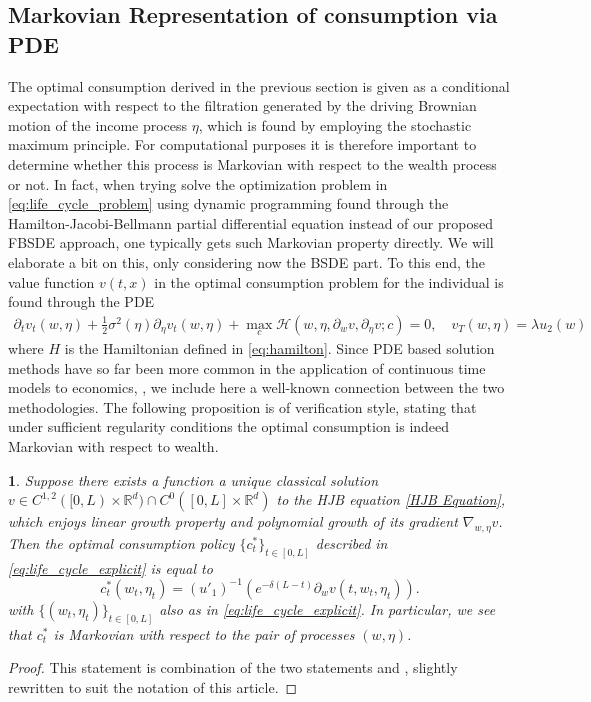 \documentclass[11pt,oneside,english,reqno,dvipsnames,table]{amsart}
\numberwithin{equation}{section}
\theoremstyle{plain}
\theoremstyle{definition}
\theoremstyle{remark}
\theoremstyle{plain}
\theoremstyle{plain}
\newtheorem{prop}[thm]{\protect\propositionname}
\theoremstyle{plain}
\theoremstyle{plain}
\theoremstyle{plain}
\theoremstyle{plain}
\theoremstyle{plain}
\providecommand{\propositionname}{Proposition}
\newcommand{\cH}{\mathcal{H}}
\newcommand{\RR}{\mathbb{R}}
\numberwithin{thm}{section}
\begin{document}
\subsection{Markovian Representation of consumption via PDE}
The optimal consumption derived in the previous section is given as a conditional expectation with respect to the filtration generated by the driving Brownian motion of the income process $\eta$, which is found by employing the stochastic maximum principle.  For computational purposes it is therefore important to determine whether this process is Markovian with respect to the wealth process or not. In fact, when trying solve the optimization problem in \eqref{eq:life_cycle_problem} using dynamic programming found through the Hamilton-Jacobi-Bellmann partial differential equation instead of our proposed FBSDE approach, one typically gets such Markovian property directly. We will elaborate a bit on this, only considering now the BSDE part. To this end, the value function $v(t,x)$ in the optimal consumption problem for the individual is found through the PDE 
%
\begin{align}\label{HJB Equation}
\partial_t v_t(w,\eta) + \frac{1}{2} \sigma^2(\eta) \partial_{\eta} v_t(w,\eta) + \max_{c}\cH(w,\eta,\partial_w v,\partial_\eta v;c )  = 0, \quad v_T(w,\eta) = \lambda u_2(w)%
\end{align}
%
where $H$ is the Hamiltonian defined in \eqref{eq:hamilton}. 
Since PDE based solution methods have so far been more common in the application of continuous time models to economics, \cite{achdou_francisco_lasry_lions_moll_14_pde,gabaix_lasry_lions_moll_16_dynamics, achdou_han_lasry_lions_moll_21_income}, we include here a well-known connection between the two methodologies. The following proposition is of verification style, stating that under sufficient regularity conditions the  optimal consumption is indeed Markovian with respect to wealth. 

\begin{prop}\label{prop:consumption_markovian}
  Suppose there exists a function a unique classical solution $v\in C^{1,2}([0,L)\times \RR^d)\cap C^0([0,L]\times \RR^d)$ to the HJB equation \eqref{HJB Equation}, which enjoys linear growth property and polynomial growth of its gradient $\nabla_{w,\eta} v$.  
%
  Then the optimal consumption policy $\{c_t^*\}_{t\in [0,L]}$ described in \eqref{eq:life_cycle_explicit} is equal to 
\[   c_t^*(w_t,\eta_t)= (u'_1)^{-1}(e^{-\delta (L-t)}\partial_w v(t,w_t,\eta_t)).    \] 
%
with $\{(w_t,\eta_t)\}_{t\in [0,L]}$ also as in  \eqref{eq:life_cycle_explicit}.
%
% 
%
In particular, we see that $c^*_t$ is Markovian with respect to the pair of processes $(w,\eta)$.
\end{prop}
%
\begin{proof}
  This statement is combination of the two statements  \cite[Prop. 6.3.2]{pham_09_continuous} and \cite[Thm.~6.4.7]{pham_09_continuous}, slightly rewritten to suit the notation of this article. 
\end{proof}
\end{document}
